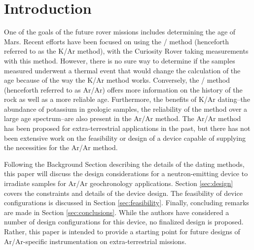\documentclass{mc2015}
\begin{document}
\section{Introduction}

One of the goals of the future rover missions includes determining the age of Mars. Recent efforts have been focused on using the / method \cite{farley_situ_2014,farley_double-spike_2013,cassata_situ_2014} (henceforth referred to as the K/Ar method), with the Curiosity Rover taking measurements with this method. However, there is no sure way to determine if the samples measured underwent a thermal event that would change the calculation of the age because of the way the K/Ar method works. Conversely, the / method \cite{mcdougall_geochronology_1999} (henceforth referred to as Ar/Ar) offers more information on the history of the rock as well as a more reliable age. Furthermore, the benefits of K/Ar dating--the abundance of potassium in geologic samples, the reliability of the method over a large age spectrum--are also present in the Ar/Ar method. The Ar/Ar method has been proposed for extra-terrestrial applications \cite{li_evaluation_2011} in the past, but there has not been extensive work on the feasibility or design of a device capable of supplying the necessities for the Ar/Ar method.

Following the Background Section describing the details of the dating methods, this paper will discuss the design considerations for a neutron-emitting device to irradiate samples for Ar/Ar geochronology applications. Section \ref{sec:design} covers the constraints and details of the device design. The feasibility of device configurations is discussed in Section \ref{sec:feasibility}. Finally, concluding remarks are made in Section \ref{sec:conclusions}. While the authors have considered a number of design configurations for this device, no finalized design is proposed. Rather, this paper is intended to provide a starting point for future designs of Ar/Ar-specific instrumentation on extra-terrestrial missions. 
\end{document}
